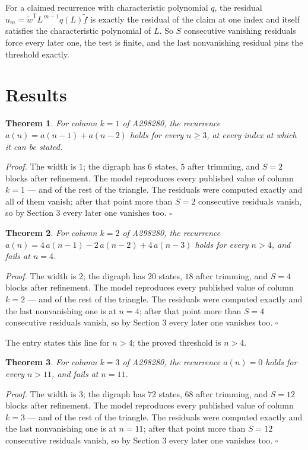 \documentclass[11pt]{article}
\newtheorem{theorem}{Theorem}
\theoremstyle{definition}
\begin{document}
For a claimed recurrence with characteristic polynomial $q$, the residual $u_m = \tilde w^{\mathsf T}L^{\,m-1}q(L)\tilde f$ is exactly the residual of the claim at one index and itself satisfies the characteristic polynomial of $L$. So $S$ consecutive vanishing residuals force every later one, the test is finite, and the last nonvanishing residual pins the threshold exactly.

\section{Results}

\begin{theorem} For column $k = 1$ of A298280, the recurrence $a(n) = a(n-1) + a(n-2)$ holds for every $n \ge 3$, at every index at which it can be stated.\end{theorem}

{\itshape Proof.} The width is $1$; the digraph has $6$ states, $5$ after trimming, and $S = 2$ blocks after refinement. The model reproduces every published value of column $k = 1$ --- and of the rest of the triangle. The residuals were computed exactly and all of them vanish; after that point more than $S = 2$ consecutive residuals vanish, so by Section 3 every later one vanishes too. $\square$

\begin{theorem} For column $k = 2$ of A298280, the recurrence $a(n) = 4\,a(n-1) - 2\,a(n-2) + 4\,a(n-3)$ holds for every $n > 4$, and fails at $n = 4$.\end{theorem}

{\itshape Proof.} The width is $2$; the digraph has $20$ states, $18$ after trimming, and $S = 4$ blocks after refinement. The model reproduces every published value of column $k = 2$ --- and of the rest of the triangle. The residuals were computed exactly and the last nonvanishing one is at $n = 4$; after that point more than $S = 4$ consecutive residuals vanish, so by Section 3 every later one vanishes too. $\square$

The entry states this line for $n > 4$; the proved threshold is $n > 4$.

\begin{theorem} For column $k = 3$ of A298280, the recurrence $a(n) = 0$ holds for every $n > 11$, and fails at $n = 11$.\end{theorem}

{\itshape Proof.} The width is $3$; the digraph has $72$ states, $68$ after trimming, and $S = 12$ blocks after refinement. The model reproduces every published value of column $k = 3$ --- and of the rest of the triangle. The residuals were computed exactly and the last nonvanishing one is at $n = 11$; after that point more than $S = 12$ consecutive residuals vanish, so by Section 3 every later one vanishes too. $\square$
\end{document}
